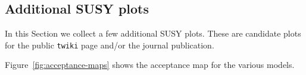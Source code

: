 


\subsection{Additional SUSY plots}
\label{sec:moreSUSYplos}

In this Section we collect a few additional SUSY plots.  These are 
candidate plots for the public {\tt twiki} page and/or the 
journal publication.

Figure~\ref{fig:acceptance-maps} shows the acceptance map
for the various models.

